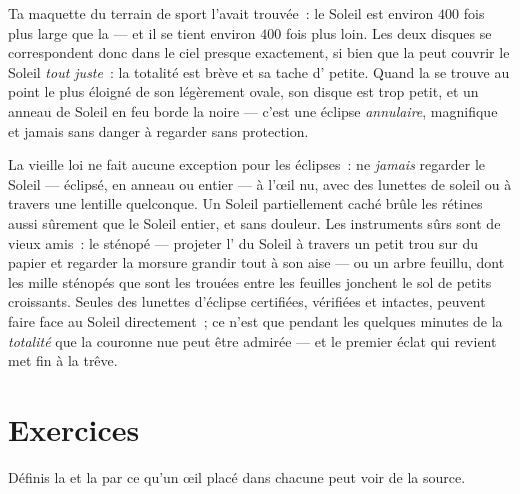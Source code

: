 \begin{example}\label{ex:g7:shadows-eclipses:coincidence}
Ta maquette du terrain de sport l'avait trouvée~: le Soleil est
environ $400$ fois plus large que la  --- et il se tient environ
$400$ fois plus loin. Les deux disques se correspondent donc dans le
ciel presque exactement, si bien que la  peut couvrir le Soleil
\emph{tout juste}~: la totalité est brève et sa tache d' petite.
Quand la  se trouve au point le plus éloigné de son 
légèrement ovale, son disque est trop petit, et un anneau de Soleil
en feu borde la  noire --- c'est une éclipse \emph{annulaire},
magnifique et jamais sans danger à regarder sans protection.
\end{example}

\begin{remark}\label{rem:g7:shadows-eclipses:safety}
La vieille loi ne fait aucune exception pour les éclipses~: ne
\emph{jamais} regarder le Soleil --- éclipsé, en anneau ou entier ---
à l'œil nu, avec des lunettes de soleil ou à travers une lentille
quelconque. Un Soleil partiellement caché brûle les rétines aussi
sûrement que le Soleil entier, et sans douleur. Les instruments sûrs
sont de vieux amis~: le sténopé --- projeter l' du Soleil à
travers un petit trou sur du papier et regarder la morsure grandir
tout à son aise --- ou un arbre feuillu, dont les mille sténopés que
sont les trouées entre les feuilles jonchent le sol de petits
croissants. Seules des lunettes d'éclipse certifiées, vérifiées et
intactes, peuvent faire face au Soleil directement~; ce n'est que
pendant les quelques minutes de la \emph{totalité} que la couronne
nue peut être admirée --- et le premier éclat qui revient met fin à
la trêve.
\end{remark}

\section{Exercices}

\begin{exercise}[$\star$]\label{exo:g7:shadows-eclipses:1}
Définis la  et la  par ce qu'un œil placé
dans chacune peut voir de la source.
\end{exercise}

